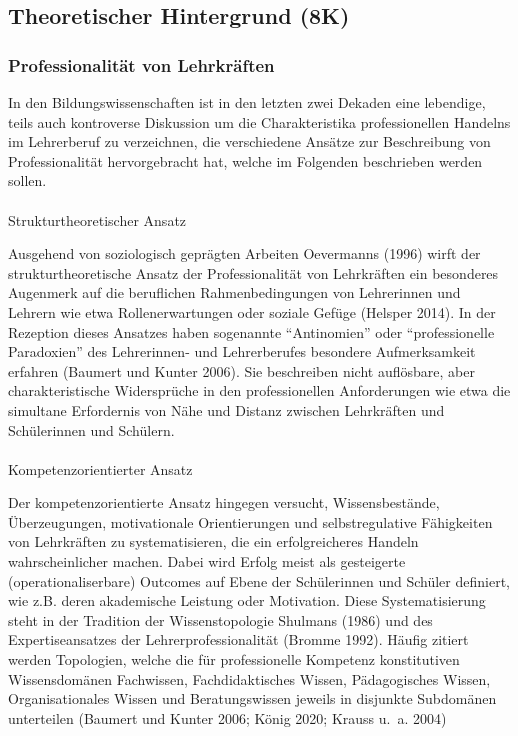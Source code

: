 \documentclass[
  letterpaper,
  DIV=11]{scrartcl}
\makeatletter
\let\oldparagraph\paragraph
\renewcommand{\paragraph}{
    \@ifstar
      \xxxParagraphStar
      \xxxParagraphNoStar
  }
\newcommand{\xxxParagraphStar}[1]{\oldparagraph*{#1}\mbox{}}
\newcommand{\xxxParagraphNoStar}[1]{\oldparagraph{#1}\mbox{}}
\makeatother
\begin{document}
\subsection{Theoretischer Hintergrund
(8K)}\label{theoretischer-hintergrund-8k}

\subsubsection{Professionalität von
Lehrkräften}\label{sec-professionalitat-von-lehrkraften}

In den Bildungswissenschaften ist in den letzten zwei Dekaden eine
lebendige, teils auch kontroverse Diskussion um die Charakteristika
professionellen Handelns im Lehrerberuf zu verzeichnen, die verschiedene
Ansätze zur Beschreibung von Professionalität hervorgebracht hat, welche
im Folgenden beschrieben werden sollen.

\paragraph{Strukturtheoretischer
Ansatz}\label{strukturtheoretischer-ansatz}

Ausgehend von soziologisch geprägten Arbeiten Oevermanns (1996) wirft
der strukturtheoretische Ansatz der Professionalität von Lehrkräften ein
besonderes Augenmerk auf die beruflichen Rahmenbedingungen von
Lehrerinnen und Lehrern wie etwa Rollenerwartungen oder soziale Gefüge
(Helsper 2014). In der Rezeption dieses Ansatzes haben sogenannte
``Antinomien'' oder ``professionelle Paradoxien'' des Lehrerinnen- und
Lehrerberufes besondere Aufmerksamkeit erfahren (Baumert und Kunter
2006). Sie beschreiben nicht auflösbare, aber charakteristische
Widersprüche in den professionellen Anforderungen wie etwa die simultane
Erfordernis von Nähe und Distanz zwischen Lehrkräften und Schülerinnen
und Schülern.

\paragraph{Kompetenzorientierter
Ansatz}\label{kompetenzorientierter-ansatz}

Der kompetenzorientierte Ansatz hingegen versucht, Wissensbestände,
Überzeugungen, motivationale Orientierungen und selbstregulative
Fähigkeiten von Lehrkräften zu systematisieren, die ein erfolgreicheres
Handeln wahrscheinlicher machen. Dabei wird Erfolg meist als gesteigerte
(operationaliserbare) Outcomes auf Ebene der Schülerinnen und Schüler
definiert, wie z.B. deren akademische Leistung oder Motivation. Diese
Systematisierung steht in der Tradition der Wissenstopologie Shulmans
(1986) und des Expertiseansatzes der Lehrerprofessionalität (Bromme
1992). Häufig zitiert werden Topologien, welche die für professionelle
Kompetenz konstitutiven Wissensdomänen Fachwissen, Fachdidaktisches
Wissen, Pädagogisches Wissen, Organisationales Wissen und
Beratungswissen jeweils in disjunkte Subdomänen unterteilen (Baumert und
Kunter 2006; König 2020; Krauss u.~a. 2004)
\end{document}
